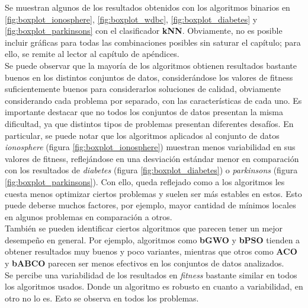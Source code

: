 Se muestran algunos de los resultados obtenidos con los algoritmos binarios en \ref{fig:boxplot_ionosphere}, \ref{fig:boxplot_wdbc}, \ref{fig:boxplot_diabetes} y \ref{fig:boxplot_parkinsons} con el clasificador \textbf{kNN}. Obviamente, no es posible incluir gráficas para todas las combinaciones posibles sin saturar el capítulo; para ello, se remite al lector al capítulo de apéndices.\\[6pt]
Se puede observar que la mayoría de los algoritmos obtienen resultados bastante buenos en los distintos conjuntos de datos, considerándose los valores de fitness suficientemente buenos para considerarlos soluciones de calidad, obviamente considerando cada problema por separado, con las características de cada uno. Es importante destacar que no todos los conjuntos de datos presentan la misma dificultad, ya que distintos tipos de problemas presentan diferentes desafíos. En particular, se puede notar que los algoritmos aplicados al conjunto de datos \textit{ionosphere} (figura \ref{fig:boxplot_ionosphere}) muestran menos variabilidad en sus valores de fitness, reflejándose en una desviación estándar menor en comparación con los resultados de \textit{diabetes} (figura \ref{fig:boxplot_diabetes}) o \textit{parkinsons} (figura \ref{fig:boxplot_parkinsons}). Con ello, queda reflejado como a los algoritmos les cuesta menos optimizar ciertos problemas y suelen ser más estables en estos. Esto puede deberse muchos factores, por ejemplo, mayor cantidad de mínimos locales en algunos problemas en comparación a otros.\\[6pt]
También se pueden identificar ciertos algoritmos que parecen tener un mejor desempeño en general. Por ejemplo, algoritmos como \textbf{bGWO} y \textbf{bPSO} tienden a obtener resultados muy buenos y poco variantes, mientras que otros como \textbf{ACO} y \textbf{bABCO} parecen ser menos efectivos en los conjuntos de datos analizados.\\[6pt]
Se percibe una variabilidad de los resultados en \textit{fitness} bastante similar en todos los algoritmos usados. Donde un algoritmo es robusto en cuanto a variabilidad, en otro no lo es. Esto se observa en todos los problemas.

